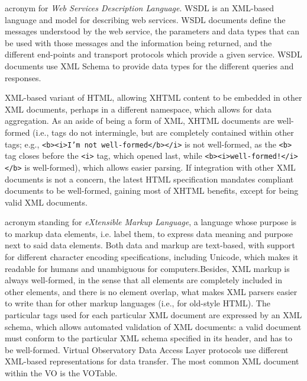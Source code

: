 {
    	acronym for \emph{Web Services Description Language}. WSDL is
        an \gls{XML}-based language and model for describing \gls{web
        services}. WSDL documents define the messages understood by the
        web service, the parameters and data types that can be used
        with those messages and the information being returned, and the
        different end-points and transport protocols which provide a
        given service. WSDL documents use \gls{XML Schema} to provide
        data types for the different queries and responses.
}

{    	\gls{XML}-based variant of \gls{HTML}, allowing XHTML content
        to be embedded in other XML documents, perhaps in a different
        namespace, which allows for data aggregation. As an aside of
        being a form of XML, XHTML documents are well-formed (i.e.,
        \gls{tags} do not intermingle, but are completely contained
        within other tags; e.g., \texttt{<b><i>I'm not
        well-formed</b></i>} is not well-formed, as the \texttt{<b>}
        tag closes before the \texttt{<i>} tag, which opened last,
        while \texttt{<b><i>well-formed!</i></b>} is well-formed),
        which allows easier parsing. If integration with other XML
        documents is not a concern, the latest HTML specification
        mandates compliant documents to be well-formed, gaining most of
        XHTML benefits, except for being valid XML documents.
}

{
    	acronym standing for \emph{eXtensible Markup Language}, a
        language whose purpose is to \gls{markup} data elements, i.e.
        label them, to express data meaning and purpose next to said
        data elements. Both data and markup are text-based, with
        support for different character encoding specifications,
        including Unicode, which makes it readable for humans and
        unambiguous for computers.Besides, XML markup is always
        well-formed, in the sense that all elements are completely
        included in other elements, and there is no element overlap,
        what makes XML parsers easier to write than for other markup
        languages (i.e., for old-style \gls{HTML}). The particular
        \gls{tags} used for each particular XML document are expressed
        by an \gls{XML schema}, which allows automated validation of
        XML documents: a valid document must conform to the particular
        XML schema specified in its header, and has to be well-formed.
        \gls{Virtual Observatory} \gls{Data Access Layer} protocols use
        different XML-based representations for data transfer. The most
        common XML document within the VO is the \gls{VOTable}.
}

